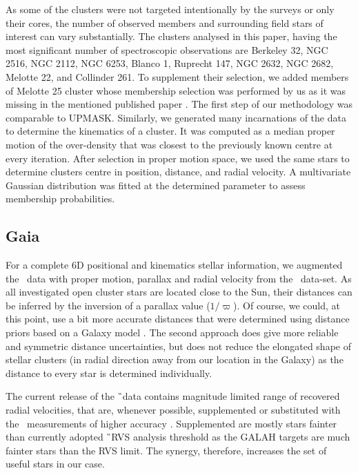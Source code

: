 As some of the clusters were not targeted intentionally by the surveys or only their cores, the number of observed members and surrounding field stars of interest can vary substantially. The clusters analysed in this paper, having the most significant number of spectroscopic observations are Berkeley 32, NGC 2516, NGC 2112, NGC 6253, Blanco 1, Ruprecht 147, NGC 2632, NGC 2682,  Melotte 22, and Collinder 261. To supplement their selection, we added members of Melotte 25 cluster whose membership selection was performed by us as it was missing in the mentioned published paper \cite{2018A&A...618A..93C}. The first step of our methodology was comparable to UPMASK. Similarly, we generated many incarnations of the data to determine the kinematics of a cluster. It was computed as a median proper motion of the over-density that was closest to the previously known centre at every iteration. After selection in proper motion space, we used the same stars to determine clusters centre in position, distance, and radial velocity. A multivariate Gaussian distribution was fitted at the determined parameter to assess membership probabilities.

\subsection{Gaia}
\label{sec:gaia_clusters}
For a complete 6D positional and kinematics stellar information, we augmented the \Gh\ data with proper motion, parallax and radial velocity from the \Gs\ data-set. As all investigated open cluster stars are located close to the Sun, their distances can be inferred by the inversion of a parallax value ($1 / \varpi$). Of course, we could, at this point, use a bit more accurate distances that were determined using distance priors based on a Galaxy model \cite{2018AJ....156...58B}. The second approach does give more reliable and symmetric distance uncertainties, but does not reduce the elongated shape of stellar clusters (in radial direction away from our location in the Galaxy) as the distance to every star is determined individually.

The current release of the \G\ data contains magnitude limited range of recovered radial velocities, that are, whenever possible, supplemented or substituted with the \Gh\ measurements of higher accuracy \cite{2018arXiv180406344Z}. Supplemented are mostly stars fainter than currently adopted \G\ RVS \cite{2018A&A...616A...5C} analysis threshold as the GALAH targets are much fainter stars than the RVS limit. The synergy, therefore, increases the set of useful stars in our case.

